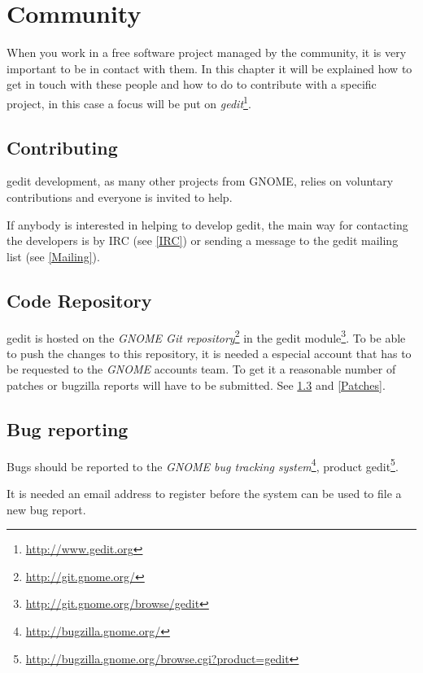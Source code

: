 
\chapter{Community}

When you work in a free software project managed by the community, it is very important to be in contact with them. In this chapter it will be explained how to get in touch with these people and how to do to contribute with a specific project, in this case a focus will be put on \emph{gedit}\footnote{\url{http://www.gedit.org}}.

\section{Contributing}\label{Contributing}

gedit development, as many other projects from GNOME, relies on voluntary contributions and everyone is invited to help.

If anybody is interested in helping to develop gedit, the main way for contacting the developers is by IRC (see \ref{IRC}) or sending a message to the gedit mailing list (see \ref{Mailing}).

\section{Code Repository}\label{Repository}

gedit is hosted on the \emph{GNOME Git repository}\footnote{\url{http://git.gnome.org/}} in the gedit module\footnote{\url{http://git.gnome.org/browse/gedit}}. To be able to push the changes to this repository, it is needed a especial account that has to be requested to the \emph{GNOME} accounts team. To get it a reasonable number of patches or bugzilla reports will have to be submitted. See \ref{Bugs} and \ref{Patches}.

\section{Bug reporting}\label{Bugs}

Bugs should be reported to the \emph{GNOME bug tracking system}\footnote{\url{http://bugzilla.gnome.org/}}, product gedit\footnote{\url{http://bugzilla.gnome.org/browse.cgi?product=gedit}}.

It is needed an email address to register before the system can be used to file a new bug report.

